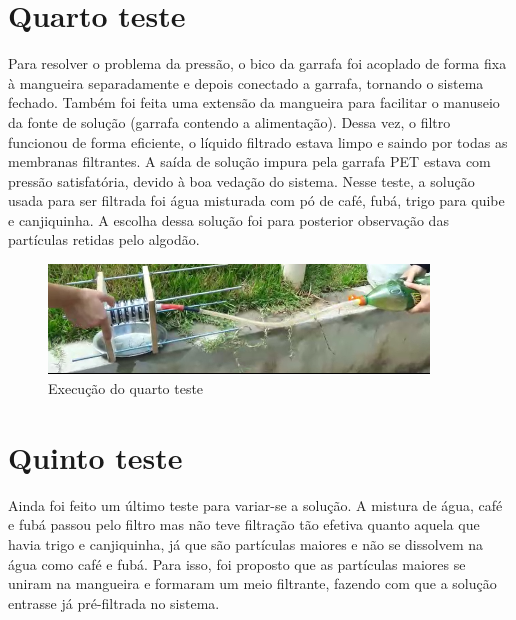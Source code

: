 \section{Quarto teste}\label{sec:quarto_teste}

Para resolver o problema da pressão, o bico da garrafa foi acoplado de forma
fixa à mangueira separadamente e depois conectado a garrafa, tornando o sistema
fechado. Também foi feita uma extensão da mangueira para facilitar o manuseio da
fonte de solução (garrafa contendo a alimentação). Dessa vez, o filtro funcionou
de forma eficiente, o líquido filtrado estava limpo e saindo por todas as
membranas filtrantes. A saída de solução impura pela garrafa PET estava com
pressão satisfatória, devido à boa vedação do sistema. Nesse teste, a solução
usada para ser filtrada foi água misturada com pó de café, fubá, trigo para
quibe e canjiquinha. A escolha dessa solução foi para posterior observação das
partículas retidas pelo algodão.

\begin{figure}[H]
  \centering
  \includegraphics[width=0.9\textwidth]{figuras/quarto_teste.png}
  \caption{Execução do quarto teste\label{fig:quarto_teste}}
\end{figure}


\section{Quinto teste}\label{sec:quinto_teste}

Ainda foi feito um último teste para variar-se a solução. A mistura de água,
café e fubá passou pelo filtro mas não teve filtração tão efetiva quanto aquela
que havia trigo e canjiquinha, já que são partículas maiores e não se dissolvem
na água como café e fubá. Para isso, foi proposto que as partículas maiores se
uniram na mangueira e formaram um meio filtrante, fazendo com que a solução
entrasse já pré-filtrada no sistema.



